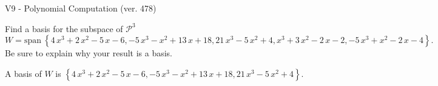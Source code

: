 \begin{exercise}
  \begin{exerciseTitle}V9 - Polynomial Computation (ver. 478)\end{exerciseTitle}
  \begin{exerciseStatement}
    Find a basis for the subspace of \(\mathcal{P}^3\) 
\[W=\mathrm{span}\ \left\{4 \, x^{3} + 2 \, x^{2} - 5 \, x - 6 , -5 \, x^{3} - x^{2} + 13 \, x + 18 , 21 \, x^{3} - 5 \, x^{2} + 4 , x^{3} + 3 \, x^{2} - 2 \, x - 2 , -5 \, x^{3} + x^{2} - 2 \, x - 4\right\}.\]
 Be sure to explain why your result is a basis.


  \end{exerciseStatement}
  \begin{exerciseAnswer}
   A basis of \(W\) is  \(\left\{4 \, x^{3} + 2 \, x^{2} - 5 \, x - 6 , -5 \, x^{3} - x^{2} + 13 \, x + 18 , 21 \, x^{3} - 5 \, x^{2} + 4\right\}\).
  


  \end{exerciseAnswer}
\end{exercise}